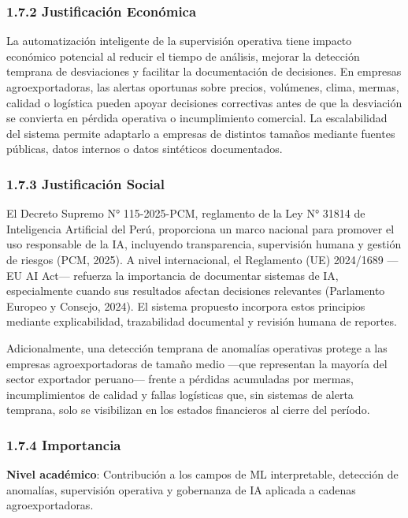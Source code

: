 \subsubsection{1.7.2 Justificación
Económica}\label{justificaciuxf3n-econuxf3mica}

La automatización inteligente de la supervisión operativa tiene impacto
económico potencial al reducir el tiempo de análisis, mejorar la
detección temprana de desviaciones y facilitar la documentación de
decisiones. En empresas agroexportadoras, las alertas oportunas sobre
precios, volúmenes, clima, mermas, calidad o logística pueden apoyar
decisiones correctivas antes de que la desviación se convierta en
pérdida operativa o incumplimiento comercial. La escalabilidad del
sistema permite adaptarlo a empresas de distintos tamaños mediante
fuentes públicas, datos internos o datos sintéticos documentados.

\subsubsection{1.7.3 Justificación
Social}\label{justificaciuxf3n-social}

El Decreto Supremo N° 115-2025-PCM, reglamento de la Ley N° 31814 de
Inteligencia Artificial del Perú, proporciona un marco nacional para
promover el uso responsable de la IA, incluyendo transparencia,
supervisión humana y gestión de riesgos (PCM, 2025). A nivel
internacional, el Reglamento (UE) 2024/1689 ---EU AI Act--- refuerza la
importancia de documentar sistemas de IA, especialmente cuando sus
resultados afectan decisiones relevantes (Parlamento Europeo y Consejo,
2024). El sistema propuesto incorpora estos principios mediante
explicabilidad, trazabilidad documental y revisión humana de reportes.

Adicionalmente, una detección temprana de anomalías operativas protege a
las empresas agroexportadoras de tamaño medio ---que representan la
mayoría del sector exportador peruano--- frente a pérdidas acumuladas
por mermas, incumplimientos de calidad y fallas logísticas que, sin
sistemas de alerta temprana, solo se visibilizan en los estados
financieros al cierre del período.

\subsubsection{1.7.4 Importancia}\label{importancia}

\textbf{Nivel académico}: Contribución a los campos de ML interpretable,
detección de anomalías, supervisión operativa y gobernanza de IA
aplicada a cadenas agroexportadoras.

